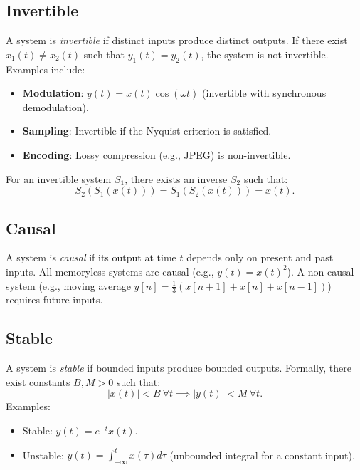 \subsection{Invertible}
A system is \emph{invertible} if distinct inputs produce distinct outputs. If there exist \( x_1(t) \neq x_2(t) \) such that \( y_1(t) = y_2(t) \), the system is not invertible. Examples include:
\begin{itemize}
    \item \textbf{Modulation}: \( y(t) = x(t)\cos(\omega t) \) (invertible with synchronous demodulation).
    \item \textbf{Sampling}: Invertible if the Nyquist criterion is satisfied.
    \item \textbf{Encoding}: Lossy compression (e.g., JPEG) is non-invertible.
\end{itemize}
For an invertible system \( S_1 \), there exists an inverse \( S_2 \) such that:
\[
    S_2(S_1(x(t))) = S_1(S_2(x(t))) = x(t).
\]


\subsection{Causal}
A system is \emph{causal} if its output at time \( t \) depends
only on present and past inputs. All memoryless systems are causal
(e.g., \( y(t) = x(t)^2 \)). A non-causal system (e.g., moving average
\( y[n] = \frac{1}{3}(x[n+1] + x[n] + x[n-1]) \)) requires future inputs.

\subsection{Stable}
A system is \emph{stable} if bounded inputs produce
bounded outputs. Formally, there exist constants \( B, M > 0 \)
such that:
\[
    |x(t)| < B \ \forall t \implies |y(t)| < M \ \forall t.
\]
Examples:
\begin{itemize}
    \item Stable: \( y(t) = e^{-t}x(t) \).
    \item Unstable: \( y(t) = \int_{-\infty}^t x(\tau) d\tau \) (unbounded integral for a constant input).
\end{itemize}